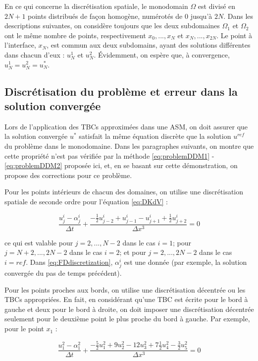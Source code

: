 \indent En ce qui concerne la discrétisation spatiale, le monodomain $\Omega$ est divisé en $2N+1$ points distribués de façon homogène, numérotés de $0$ jusqu'à $2N$. Dans les descriptions suivantes, on considère toujours que les deux subdomaines $\Omega_1$ et $\Omega_2$ ont le même nombre de points, respectivement  $x_0,...,x_N$ et $x_N,...,x_{2N}$. Le point à l'interface, $x_N$, est commun aux deux subdomains, ayant des solutions différentes dans chacun d'eux : $u_N^1$ et $u_N^2$. Évidemment, on espère que, à convergence, $u_N^1 = u_N^2 = u_N^*$.


\subsection{Discrétisation du problème et erreur dans la solution convergée}

\indent Lors de l'application des TBCs approximées dans une ASM, on doit assurer que la solution convergée $u^*$ satisfait la même équation discrète que la solution $u^{ref}$ du problème dans le monodomaine. Dans les paragraphes suivants, on montre que cette propriété n'est pas vérifiée par la méthode  \eqref{eq:problemDDM1} - \eqref{eq:problemDDM2} proposée ici, et, en se basant sur cette démonstration, on propose des corrections pour ce problème.

\indent Pour les points intérieurs de chacun des domaines, on utilise une discrétisation spatiale de seconde ordre pour l'équation \eqref{eq:DKdV} :

\begin{equation}
    \label{eq:FDdiscretization}
    \frac{u_j^i - \alpha_j^i}{\Delta t} + \frac{-\frac{1}{2}u_{j-2}^i + u_{j-1}^i - u_{j+1}^i + \frac{1}{2}u_{j+2}^i }{\Delta x ^3} = 0
\end{equation}

\noindent ce qui est valable pour $j=2,...,N-2$ dans le cas $i=1$; pour $j=N+2,...,2N-2$ dans le cas $i=2$; et pour $j=2,...,2N-2$ dans le cas $i=ref$. Dans \eqref{eq:FDdiscretization}, $\alpha_j^i$ est une donnée (par exemple, la solution convergée du pas de temps précédent).

\indent Pour les points proches aux bords, on utilise une discrétisation décentrée ou les TBCs appropriées. En fait, en considérant qu'une TBC est écrite pour le bord à gauche et deux pour le bord à droite, on doit imposer une discrétisation décentrée seulement pour le deuxième point le plus proche du bord à gauche. Par exemple, pour le point $x_1$ : 

\begin{equation*}
    \frac{u_{1}^2 - \alpha_{1}^2}{\Delta t} + \frac{-\frac{5}{2}u_{1}^2 + 9u_{2}^2 - 12 u_{3}^2 + 7\frac{1}{2}u_{4}^2 -\frac{3}{2}u_{5}^2}{\Delta x ^3} = 0
\end{equation*}

